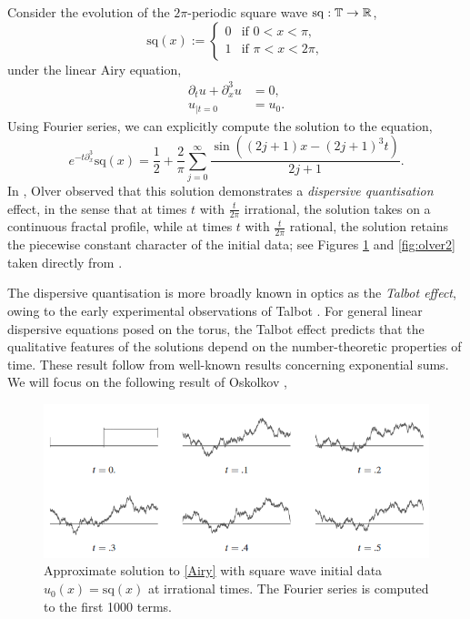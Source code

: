 
Consider the evolution of the $2\pi$-periodic square wave $\mathrm{sq} : \mathbb T \to \mathbb R$, 
\[
	\mathrm{sq} (x)
		:= 
		\begin{cases}
			0
				&\text{if $0 < x < \pi$}, \\
			1 
				&\text{if $\pi < x < 2\pi$},
		\end{cases}
\]
under the linear Airy equation, 
\begin{equation}\tag{A}\label{eq:Airy}
	\begin{split}
		\partial_t u + \partial_x^3 u
			&= 0, \\
		u_{|t = 0}
			&= u_0. 
	\end{split}
	\end{equation}
Using Fourier series, we can explicitly compute the solution to the equation, 
	\[
		e^{-t \partial_x^3} \mathrm{sq} (x) 
			= \frac12 + \frac2\pi \sum_{j = 0}^\infty \frac{\sin((2j + 1)x - (2j + 1)^3 t)}{2j + 1}. 
	\]
In \cite{Olver2010}, Olver observed that this solution demonstrates a \textit{dispersive quantisation} effect, in the sense that at times $t$ with $\tfrac{t}{2\pi}$ irrational, the solution takes on a continuous fractal profile, while at times $t$ with $\tfrac{t}{2\pi}$ rational, the solution retains the piecewise constant character of the initial data; see Figures \ref{fig:olver1} and \ref{fig:olver2} taken directly from \cite{Olver2010}. 

The dispersive quantisation is more broadly known in optics as the \textit{Talbot effect}, owing to the early experimental observations of Talbot \cite{Talbot1836}. For general linear dispersive equations posed on the torus, the Talbot effect predicts that the qualitative features of the solutions depend on the number-theoretic properties of time. These result follow from well-known results concerning exponential sums. We will focus on the following result of Oskolkov \cite{GoncharSaff1992}, 

\begin{figure}[h]\label{fig:olver1}
	\begin{center}
		\includegraphics{graphics/olver1}
	\end{center}
	\caption{Approximate solution to \eqref{Airy} with square wave initial data $u_0 (x) = \mathrm{sq}(x)$ at irrational times. The Fourier series is computed to the first 1000 terms.}
\end{figure}


